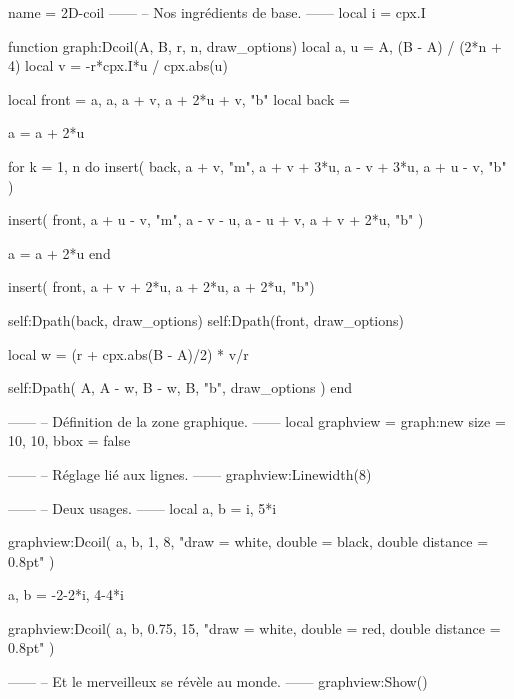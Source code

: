 \documentclass[varwidth]{standalone}
\begin{document}
\begin{luadraw}{name = 2D-coil}
------
-- Nos ingrédients de base.
------
local i = cpx.I

function graph:Dcoil(A, B, r, n, draw_options)
  local a, u = A, (B - A) / (2*n + 4)
  local v = -r*cpx.I*u / cpx.abs(u)

  local front = {a, a, a + v, a + 2*u + v, "b"}
  local back  = {}

  a = a + 2*u

  for k = 1, n do
    insert(
      back,
      {
        a + v, "m",
        a + v + 3*u, a - v + 3*u, a + u - v, "b"
      })

    insert(
      front,
      {
        a + u - v, "m",
        a - v - u, a - u + v, a + v + 2*u, "b"
      })

    a = a + 2*u
  end

  insert(
    front,
    {a + v + 2*u, a + 2*u, a + 2*u, "b"})

  self:Dpath(back, draw_options)
  self:Dpath(front, draw_options)

  local w = (r + cpx.abs(B - A)/2) * v/r

  self:Dpath(
    {A, A - w, B - w, B, "b"},
    draw_options
  )
end

------
-- Définition de la zone graphique.
------
local graphview = graph:new{
  size = {10, 10},
  bbox = false
}

------
-- Réglage lié aux lignes.
------
graphview:Linewidth(8)

------
-- Deux usages.
------
local a, b = i, 5*i

graphview:Dcoil(
  a, b, 1,
  8,
  "draw = white, double = black, double distance = 0.8pt"
)

a, b = -2-2*i, 4-4*i

graphview:Dcoil(
  a, b, 0.75,
  15,
  "draw = white, double = red, double distance = 0.8pt"
)

------
-- Et le merveilleux se révèle au monde.
------
graphview:Show()
\end{luadraw}
\end{document}
